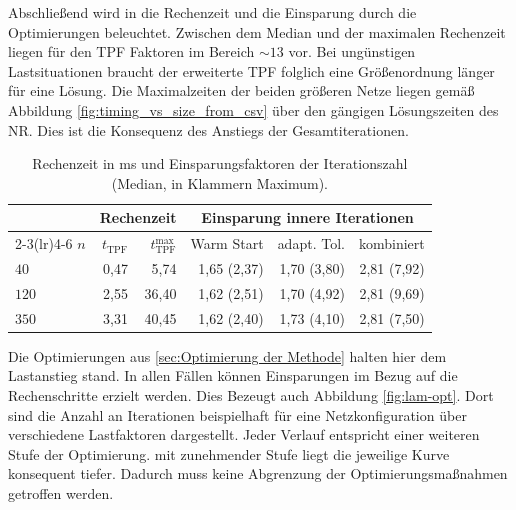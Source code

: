 Abschließend wird in  die Rechenzeit und die Einsparung durch die Optimierungen beleuchtet.
Zwischen dem Median und der maximalen Rechenzeit liegen für den TPF Faktoren im Bereich $\sim13$ vor. 
Bei ungünstigen Lastsituationen braucht der erweiterte TPF folglich eine Größenordnung länger für eine Lösung.
Die Maximalzeiten der beiden größeren Netze liegen gemäß Abbildung \ref{fig:timing_vs_size_from_csv} über den gängigen Lösungszeiten des NR.
Dies ist die Konsequenz des Anstiegs der Gesamtiterationen.\\

\begin{table}[htbp]
	\centering
	\small
	\caption{Rechenzeit in ms und Einsparungsfaktoren der Iterationszahl
		(Median, in Klammern Maximum).}
	\label{tab:lam-time}
	\begin{tabular}{lrrrrr}
		\toprule
		& \multicolumn{2}{c}{Rechenzeit} & \multicolumn{3}{c}{Einsparung innere Iterationen} \\
		\cmidrule(lr){2-3}\cmidrule(lr){4-6}
		$n$ & $t_{\mathrm{TPF}}$ & $t_{\mathrm{TPF}}^{\max}$ & 
		Warm Start & adapt. Tol. & kombiniert \\
		\midrule
		$40$  & 0,47 & 5,74    & 1,65 (2,37) & 1,70 (3,80) & 2,81 (7,92) \\
		$120$ & 2,55 & 36,40    & 1,62 (2,51) & 1,70 (4,92) & 2,81 (9,69) \\
		$350$ & 3,31 & 40,45   & 1,62 (2,40) & 1,73 (4,10) & 2,81 (7,50) \\
		\bottomrule
	\end{tabular}
\end{table}

Die Optimierungen aus \cref{sec:Optimierung der Methode} halten hier dem Lastanstieg stand. 
In allen Fällen können Einsparungen im Bezug auf die Rechenschritte erzielt werden.
Dies Bezeugt auch Abbildung \ref{fig:lam-opt}.
Dort sind die Anzahl an Iterationen beispielhaft für eine Netzkonfiguration über verschiedene Lastfaktoren dargestellt.
Jeder Verlauf entspricht einer weiteren Stufe der Optimierung.
mit zunehmender Stufe liegt die jeweilige Kurve konsequent tiefer.
Dadurch muss keine Abgrenzung der Optimierungsmaßnahmen getroffen werden.\\






